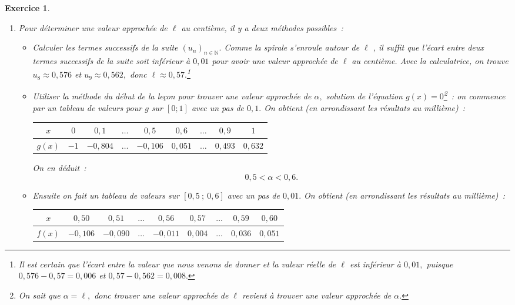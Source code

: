 \documentclass[10pt]{article}
\newtheorem{exo}{Exercice}
\begin{document}
\begin{exo}
\begin{enumerate}
\begin{enumerate}


\item Pour déterminer une valeur approchée de $\ell$ au centième, il y a deux méthodes possibles~:
\begin{itemize}
\item[\textbullet] Calculer les termes successifs de la suite $(u_n)_{n\in\mathbb{N}}.$ Comme la spirale \og s'enroule autour de $\ell$ \fg, il suffit que l'écart entre deux termes successifs de la suite soit inférieur à $0,01$ pour avoir une valeur approchée de $\ell$ au  centième. Avec la calculatrice, on trouve $u_8\approx 0,576$ et $u_9\approx 0,562,$ donc $\ell\approx 0,57.$\footnote{Il est certain que l'écart entre la valeur que nous venons de donner et la valeur réelle de $\ell$ est inférieur à $0,01,$ puisque $0,576-0,57=0,006$ et $0,57-0,562=0,008.$}
\item[\textbullet] Utiliser la méthode du début de la leçon pour trouver une valeur approchée de $\alpha,$ solution de l'équation $g(x)=0$\footnote{On sait que $\alpha=\ell,$ donc trouver une valeur approchée de $\ell$ revient à trouver une valeur approchée de $\alpha.$}~: on commence par un tableau de valeurs pour $g$ sur $\left[0;1\right]$ avec un pas de $0,1.$ On obtient (en arrondissant les résultats au millième)~:

\medskip
\begin{center}
\begin{tabular}{|c|c|c|c|c|c|c|c|c|}
\hline
$x$&$0$&$0,1$&$\dots$&$0,5$&$0,6$&$\dots$&$0,9$&$1$\\ \hline
$g(x)$&$-1$&$-0,804$&$\dots$&$-0,106$&$0,051$&$\dots$&$0,493$&$0,632$\\ \hline
\end{tabular}
\end{center}

\medskip


On en déduit~:\[0,5<\alpha<0,6.\]
\item[\textbullet] Ensuite on fait un tableau de valeurs sur $\left[0,5~;~0,6\right]$ avec un pas de $0,01.$ On obtient (en arrondissant les résultats au millième)~:

\medskip

\begin{center}

\begin{tabular}{|c|c|c|c|c|c|c|c|c|}
\hline
$x$&$0,50$&$0,51$&$\dots$&$0,56$&$0,57$&$\dots$&$0,59$&$0,60$\\ \hline
$f(x)$&$-0,106$&$ -0,090$&$\dots$&$-0,011$&$0,004$&$\dots$&$0,036$&$0,051$\\ \hline
\end{tabular}
\end{center}


\end{itemize}
\end{enumerate}
\end{enumerate}
\end{exo}
\end{document}
